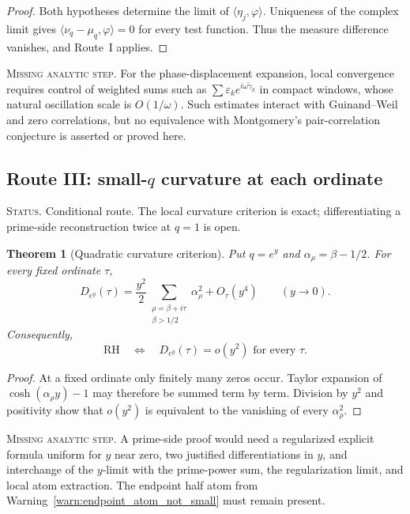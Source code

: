 \documentclass[11pt]{amsart}
\numberwithin{equation}{section}
\theoremstyle{plain}
\newtheorem{theorem}{Theorem}[section]
\theoremstyle{definition}
\theoremstyle{remark}
\newcommand{\RH}{\mathrm{RH}}
\newcommand{\1}{\mathbf{1}}
\newcommand{\statusnote}[1]{%
  \par\smallskip\noindent
  \begingroup\footnotesize\textsc{Status.} #1\endgroup
  \par\smallskip}
\newcommand{\missingnote}[1]{%
  \par\smallskip\noindent
  \begingroup\footnotesize\textsc{Missing analytic step.} #1\endgroup
  \par\smallskip}
\begin{document}
\begin{proof}
Both hypotheses determine the limit of
$\langle\eta_j,\varphi\rangle$.  Uniqueness of the complex limit gives
$\langle\nu_q-\mu_q,\varphi\rangle=0$ for every test function.  Thus the
measure difference vanishes, and Route~I applies.
\end{proof}

\missingnote{For the phase-displacement expansion, local convergence requires
control of weighted sums such as
$\sum\varepsilon_k e^{i\omega\widetilde\gamma_k}$ in compact windows,
whose natural oscillation scale is $O(1/\omega)$.  Such estimates interact
with Guinand--Weil and zero correlations, but no equivalence with
Montgomery's pair-correlation conjecture \cite{Montgomery1973} is asserted
or proved here.}

\subsection{Route III: small-\texorpdfstring{\(q\)}{q} curvature at each ordinate}
\label{subsec:route_small_q}

\statusnote{Conditional route.  The local curvature criterion is exact; differentiating a prime-side reconstruction twice at $q=1$ is open.}
\begin{theorem}[Quadratic curvature criterion]
\label{thm:small_q_curvature}
Put $q=e^y$ and $\alpha_\rho=\beta-1/2$.  For every fixed ordinate $\tau$,
\begin{equation}
D_{e^y}(\tau)
=
\frac{y^2}{2}
\sum_{\substack{\rho=\beta+i\tau\\\beta>1/2}}
\alpha_\rho^2
+O_\tau(y^4)
\qquad(y\to0).
\label{eq:small_q_curvature_expansion}
\end{equation}
Consequently,
\begin{equation}
\RH
\quad\Longleftrightarrow\quad
D_{e^y}(\tau)=o(y^2)
\text{ for every }\tau.
\label{eq:small_q_curvature_criterion}
\end{equation}
\end{theorem}

\begin{proof}
At a fixed ordinate only finitely many zeros occur.  Taylor expansion of
$\cosh(\alpha_\rho y)-1$ may therefore be summed term by term.  Division by
$y^2$ and positivity show that $o(y^2)$ is equivalent to the vanishing of
every $\alpha_\rho^2$.
\end{proof}

\missingnote{A prime-side proof would need a regularized explicit formula
uniform for $y$ near zero, two justified differentiations in $y$, and
interchange of the $y$-limit with the prime-power sum, the regularization
limit, and local atom extraction.  The endpoint half atom from
Warning~\ref{warn:endpoint_atom_not_small} must remain present.}
\end{document}
